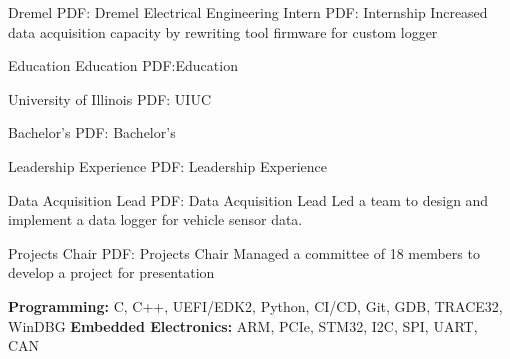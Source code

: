 \documentclass[letterpaper,MMMyyyy,nonstopmode]{simpleresumecv}
\begin{document}
\begin{Body}
\BigGap

\Entry 
{}
{Dremel}
{PDF: Dremel}
{Electrical Engineering Intern}
{PDF: Internship}
\BulletItem
    Increased data acquisition capacity by rewriting tool firmware for custom logger


\Section
{Education}
{Education}
{PDF:Education}

\Entry
{}
{University of Illinois}
{PDF: UIUC}


{Bachelor's}
{PDF: Bachelor's}



{Leadership Experience}
{PDF: Leadership Experience}

\Entry
{}
{Data Acquisition Lead}
{PDF: Data Acquisition Lead}
\BulletItem Led a team to design and implement a data logger for vehicle sensor data.
\BigGap

\Entry
{}
{Projects Chair}
{PDF: Projects Chair}
\BulletItem Managed a committee of 18 members to develop a project for presentation

\Entry 
\textbf{Programming:} C, C++, UEFI/EDK2, Python, CI/CD, Git, GDB, TRACE32, WinDBG
\Entry \textbf{Embedded Electronics:} ARM, PCIe, STM32, I2C, SPI, UART, CAN

%
%


\end{Body}
\end{document}
